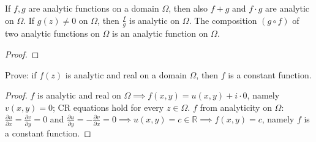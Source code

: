 \begin{proposition}\label{proposition:7.1} If $f, g$ are analytic functions on a domain $\Omega$, then also $f + g$ and $f \cdot g$ are analytic on $\Omega$. If $g(z) \neq 0$ on $\Omega$, then $\frac{f}{g}$ is analytic on $\Omega$. The composition $(g \circ f)$ of two analytic functions on $\Omega$ is an analytic function on $\Omega$.

\begin{proof}  \end{proof}
\end{proposition}
\begin{example}\label{example:9.5}
    Prove: if $f(z)$ is analytic and real on a domain $\Omega$, then $f$ is a constant function.

\begin{proof} $f$ is analytic and real on $\Omega \implies f(x,y) = u(x,y) + i \cdot 0$, namely $v(x,y) = 0$; CR equations hold for every $z \in \Omega$.
$f$ from analyticity on $\Omega$: $\frac{\partial u}{\partial x} = \frac{\partial v}{\partial y} = 0$ and 
$\frac{\partial u}{\partial y} = -\frac{\partial v}{\partial x} = 0 \implies u(x,y) = c \in \mathbb{R} \implies f(x,y) = c$, namely $f$ is a constant function.
\end{proof}
\end{example}

